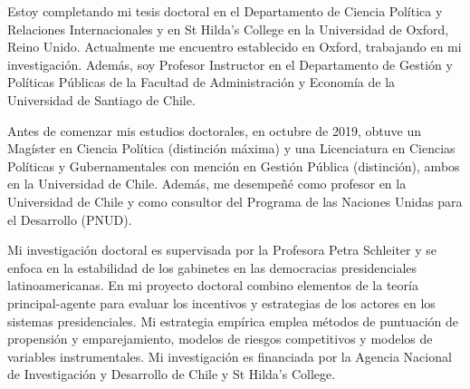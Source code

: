 




\vspace{3mm}

\begin{cvparagraph}

Estoy completando mi tesis doctoral en el Departamento de Ciencia Política y Relaciones Internacionales y en St Hilda’s College en la Universidad de Oxford, Reino Unido. Actualmente me encuentro establecido en Oxford, trabajando en mi investigación. Además, soy Profesor Instructor en el Departamento de Gestión y Políticas Públicas de la Facultad de Administración y Economía de la Universidad de Santiago de Chile.

Antes de comenzar mis estudios doctorales, en octubre de 2019, obtuve un Magíster en Ciencia Política (distinción máxima) y una Licenciatura en Ciencias Políticas y Gubernamentales con mención en Gestión Pública (distinción), ambos en la Universidad de Chile. Además, me desempeñé como profesor en la Universidad de Chile y como consultor del Programa de las Naciones Unidas para el Desarrollo (PNUD).

Mi investigación doctoral es supervisada por la Profesora Petra Schleiter y se enfoca en la estabilidad de los gabinetes en las democracias presidenciales latinoamericanas. En mi proyecto doctoral combino elementos de la teoría principal-agente para evaluar los incentivos y estrategias de los actores en los sistemas presidenciales. Mi estrategia empírica emplea métodos de puntuación de propensión y emparejamiento, modelos de riesgos competitivos y modelos de variables instrumentales. Mi investigación es financiada por la Agencia Nacional de Investigación y Desarrollo de Chile y St Hilda's College.
\vspace{1mm}
\end{cvparagraph}
